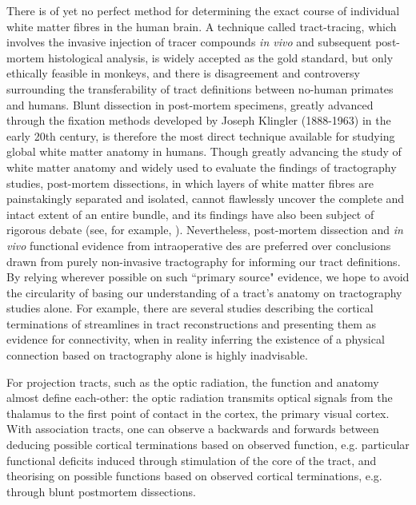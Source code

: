 There is of yet no perfect method for determining the exact course of individual white matter fibres in the human brain.
A technique called tract-tracing, which involves the invasive injection of tracer compounds \textit{in vivo} and subsequent post-mortem histological analysis, is widely accepted as the gold standard, but only ethically feasible in monkeys, and there is disagreement and controversy surrounding the transferability of tract definitions between no-human primates and humans.\autocite{Becker2022,ThiebautdeSchotten2012}
Blunt dissection in post-mortem specimens, greatly advanced through the fixation methods developed by Joseph Klingler (1888-1963) in the early 20th century,\autocite{Agrawal2011} is therefore the most direct technique available for studying global white matter anatomy in humans.
Though greatly advancing the study of white matter anatomy and widely used to evaluate the findings of tractography studies, post-mortem dissections, in which layers of white matter fibres are painstakingly separated and isolated, cannot flawlessly uncover the complete and intact extent of an entire bundle,\autocite{Martino2010, Dick2012} and its findings have also been subject of rigorous debate (see, for example, \textcite{Giampiccolo2022a,Becker2022,Giampiccolo2022b}).
Nevertheless, post-mortem dissection and \textit{in vivo} functional evidence from intraoperative \gls{des} are preferred over conclusions drawn from purely non-invasive tractography for informing our tract definitions.
By relying wherever possible on such ``primary source" evidence, we hope to avoid the circularity of basing our understanding of a tract's anatomy on tractography studies alone. %
For example, there are several studies describing the cortical terminations of streamlines in tract reconstructions and presenting them as evidence for connectivity,\autocite{Conner2018,Hau2016} when in reality inferring the existence of a physical connection based on tractography alone is highly inadvisable.\autocite{Rheault2020}

For projection tracts, such as the optic radiation, the function and anatomy almost define each-other: the optic radiation transmits optical signals from the thalamus to the first point of contact in the cortex, the primary visual cortex.
With association tracts, one can observe a backwards and forwards between deducing possible cortical terminations based on observed function, e.g. particular functional deficits induced through stimulation of the core of the tract, and theorising on possible functions based on observed cortical terminations, e.g. through blunt postmortem dissections.

